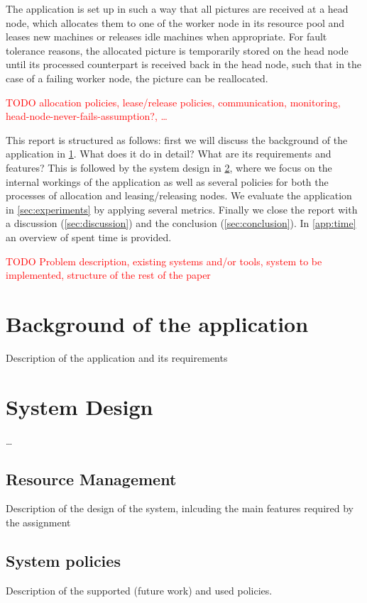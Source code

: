 \documentclass{stylesheet}
\begin{document}
The application is set up in such a way that all pictures are received at a head node, which allocates them to one of the worker node in its resource pool and leases new machines or releases idle machines when appropriate. For fault tolerance reasons, the allocated picture is temporarily stored on the head node until its processed counterpart is received back in the head node, such that in the case of a failing worker node, the picture can be reallocated.

\textcolor{red}{TODO allocation policies, lease/release policies, communication, monitoring, head-node-never-fails-assumption?, \ldots}

This report is structured as follows: first we will discuss the background of the application in \cref{sec:background}. What does it do in detail? What are its requirements and features? This is followed by the system design in \cref{sec:design}, where we focus on the internal workings of the application as well as several policies for both the processes of allocation and leasing/releasing nodes. We evaluate the application in \cref{sec:experiments} by applying several metrics. Finally we close the report with a discussion (\cref{sec:discussion}) and the conclusion (\cref{sec:conclusion}). In \cref{app:time} an overview of spent time is provided.

\textcolor{red}{TODO Problem description, existing systems and/or tools, system to be implemented, structure of the rest of the paper}

\section{Background of the application}
\label{sec:background}
Description of the application and its requirements

\section{System Design}
\label{sec:design}
\ldots
\subsection{Resource Management}
\label{subsec:resourceManagement}
Description of the design of the system, inlcuding the main features required by the assignment

\subsection{System policies}
\label{subsec:policies}
Description of the supported (future work) and used policies.
\end{document}
